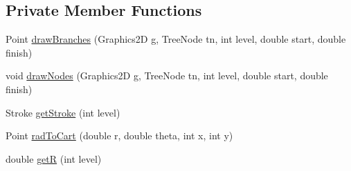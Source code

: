 \subsection*{Private Member Functions}
\begin{DoxyCompactItemize}
\item 
Point \hyperlink{classorg_1_1jgap_1_1util_1_1tree_1_1_tree_visualizer_aa46e29d117e9e9b74d9b2f05db930579}{draw\-Branches} (Graphics2\-D g, Tree\-Node tn, int level, double start, double finish)
\item 
void \hyperlink{classorg_1_1jgap_1_1util_1_1tree_1_1_tree_visualizer_ab6e41e89cdeaeece63e0317f901dfb1d}{draw\-Nodes} (Graphics2\-D g, Tree\-Node tn, int level, double start, double finish)
\item 
Stroke \hyperlink{classorg_1_1jgap_1_1util_1_1tree_1_1_tree_visualizer_a2cc6bf9f9d90aad1a3072cc21f84b667}{get\-Stroke} (int level)
\item 
Point \hyperlink{classorg_1_1jgap_1_1util_1_1tree_1_1_tree_visualizer_aed32ee6ffdaffa97e36bd9194464aca4}{rad\-To\-Cart} (double r, double theta, int x, int y)
\item 
double \hyperlink{classorg_1_1jgap_1_1util_1_1tree_1_1_tree_visualizer_a36d16c59100c8d1a9983c201333eb593}{get\-R} (int level)
\end{DoxyCompactItemize}
